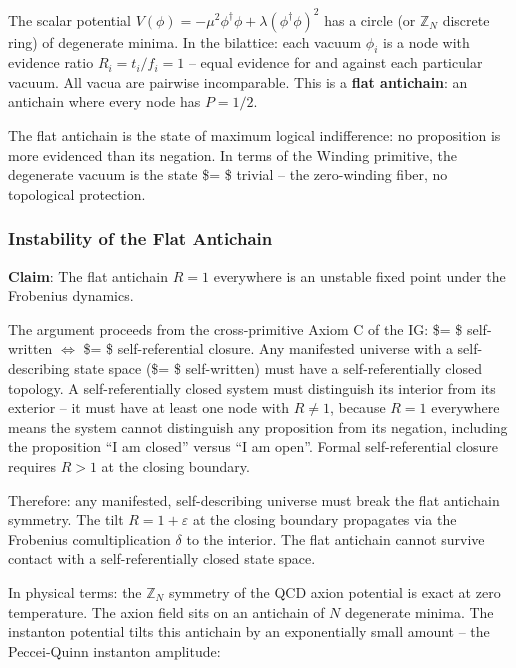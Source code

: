 \documentclass[12pt,a4paper]{article}
\begin{document}
The scalar potential
\(V(\phi) = -\mu^2 \phi^\dagger \phi + \lambda(\phi^\dagger \phi)^2\)
has a circle (or \(\mathbb{Z}_N\) discrete ring) of degenerate minima.
In the bilattice: each vacuum \(\phi_i\) is a node with evidence ratio
\(R_i = t_i/f_i = 1\) -- equal evidence for and against each particular
vacuum. All vacua are pairwise incomparable. This is a \textbf{flat
antichain}: an antichain where every node has \(P = 1/2\).

The flat antichain is the state of maximum logical indifference: no
proposition is more evidenced than its negation. In terms of the Winding
primitive, the degenerate vacuum is the state \$\Omega = \$ trivial --
the zero-winding fiber, no topological protection.

\hypertarget{instability-of-the-flat-antichain}{%
\subsubsection{Instability of the Flat
Antichain}\label{instability-of-the-flat-antichain}}

\textbf{Claim}: The flat antichain \(R = 1\) everywhere is an unstable
fixed point under the Frobenius dynamics.

The argument proceeds from the cross-primitive Axiom C of the IG:
\$\eth = \$ self-written \(\iff\) \$\Theta = \$ self-referential
closure. Any manifested universe with a self-describing state space
(\$\eth = \$ self-written) must have a self-referentially closed
topology. A self-referentially closed system must distinguish its
interior from its exterior -- it must have at least one node with
\(R \ne 1\), because \(R = 1\) everywhere means the system cannot
distinguish any proposition from its negation, including the proposition
``I am closed'' versus ``I am open''. Formal self-referential closure
requires \(R > 1\) at the closing boundary.

Therefore: any manifested, self-describing universe must break the flat
antichain symmetry. The tilt \(R = 1 + \varepsilon\) at the closing
boundary propagates via the Frobenius comultiplication \(\delta\) to the
interior. The flat antichain cannot survive contact with a
self-referentially closed state space.

In physical terms: the \(\mathbb{Z}_N\) symmetry of the QCD axion
potential is exact at zero temperature. The axion field sits on an
antichain of \(N\) degenerate minima. The instanton potential tilts this
antichain by an exponentially small amount -- the Peccei-Quinn instanton
amplitude:
\end{document}
